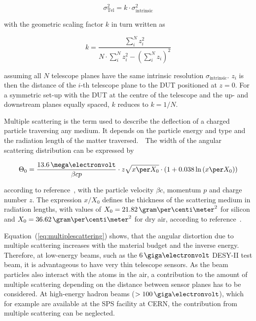 \begin{equation}
\label{eq:telescopepointing}
\sigma_{\textrm{Tel}}^2 = k \cdot \sigma_{\textrm{intrinsic}}^2
\end{equation}

\noindent with the geometric scaling factor $k$ in turn written as

\begin{equation}
k = \frac{\sum_i^N z_i^2}{N \cdot \sum_i^N z_i^2 - \left( \sum_i^N z_i
\right)^2}
\end{equation}

\noindent assuming all $N$ telescope planes have the same intrinsic resolution $\sigma_{\textrm{intrinsic}}$. 
$z_i$ is then the distance of the $i$-th telescope plane to the DUT positioned at $z=0$.
For a symmetric set-up with the DUT at the centre of the telescope and the up- and downstream planes equally spaced, $k$ reduces to $k = 1/N$. 

Multiple scattering is the term used to describe the deflection of a charged particle traversing any medium.
It depends on the particle energy and type and the radiation length of the matter traversed.\,~\cite{ref:scatteringhighland}
The width of the angular scattering distribution can be expressed by

\begin{equation}
\label{eq:multiplescattering}
\Theta_{0} = \frac{13.6\,\mega\electronvolt}{\beta c p} \cdot z
\sqrt{x \per X_0}
\cdot \left( 1 + 0.038 \ln{\left( x \per X_0\right) } \right)
\end{equation}

\noindent
according to reference~\cite{ref:PDG-2014}, with the particle velocity $\beta c$, momentum $p$ and charge number $z$. 
The expression $x/X_0$ defines the thickness of the scattering medium in radiation lengths,
 with values of $X_0 = 21.82\,\allowbreak\gram\per\centi\meter^2$ for silicon and $X_0 = 36.62\,\gram\per\centi\meter^2$ for dry air, according to reference~\cite{ref:x0values}.

Equation~(\ref{eq:multiplescattering}) shows, that the angular distortion due to multiple scattering increases with the material budget and the inverse energy.
Therefore, at low-energy beams, such as the $6\,\giga\electronvolt$ DESY-II test beam, it is advantageous to have very thin telescope sensors. 
As the beam particles also interact with the atoms in the air, a contribution to the amount of multiple scattering depending on the distance between sensor planes has to be considered. 
At high-energy hadron beams ($> 100\,\giga\electronvolt$), which for example are available at the SPS facility at CERN, the contribution from multiple scattering can be neglected.

